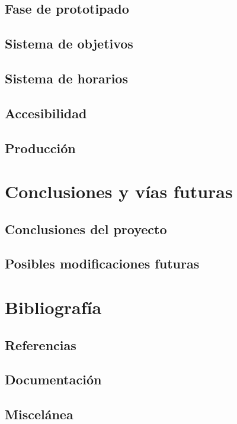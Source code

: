 \documentclass[10pt, a4paper]{aqademic}
\begin{document}
\section{Fase de prototipado}

\section{Sistema de objetivos}

\section{Sistema de horarios}

\section{Accesibilidad}

\section{Producción}


\chapter{Conclusiones y vías futuras}

\section{Conclusiones del proyecto}

\section{Posibles modificaciones futuras}


\chapter{Bibliografía}

\section{Referencias}

\section{Documentación}

\section{Miscelánea}
\end{document}
